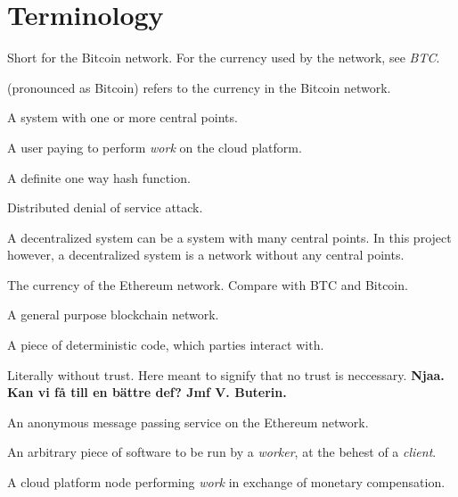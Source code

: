 \thispagestyle{plain}			%
\section*{Terminology}
\begin{description}[style=nextline]
  \item[Bitcoin] Short for the Bitcoin network. For the currency used by the network, see \emph{BTC}.
  \item[BTC] (pronounced as Bitcoin) refers to the currency in the Bitcoin network.
  \item[Centralized system] A system with one or more central points.
  \item[Client] A user paying to perform \textit{work} on the cloud platform.
  \item[Cryptographic hash] A definite one way hash function.
  \item[DDoS] Distributed denial of service attack.
  \item[Decentralized system] A decentralized system can be a system with many central points. In this project however, a decentralized system is a network without any central points.
  \item[Ether] The currency of the Ethereum network. Compare with BTC and Bitcoin.
  \item[Ethereum] A general purpose blockchain network.
  \item[Smart contract] A piece of deterministic code, which parties interact with. 
  \item[Trustless] Literally without trust. Here meant to signify that no trust is neccessary. \textbf{Njaa. Kan vi få till en bättre def? Jmf V. Buterin.}
  \item[Whisper] An anonymous message passing service on the Ethereum network.
  \item[Work] An arbitrary piece of software to be run by a \textit{worker}, at the behest of a \textit{client}.
  \item[Worker] A cloud platform node performing \textit{work} in exchange of monetary compensation.

\end{description}

\newpage				%
\thispagestyle{empty}
\mbox{}
